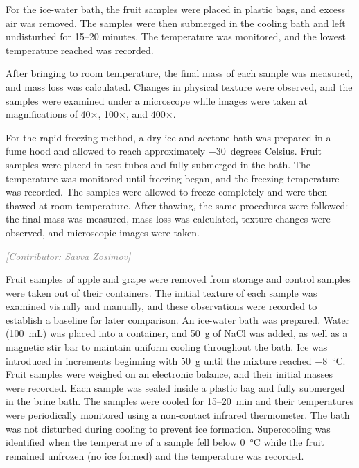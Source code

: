 \documentclass[12pt, a4paper]{article}
\newcommand{\contributor}[1]{\vspace{4pt}\noindent\textcolor{gray}{\small\textit{[Contributor: #1]}}\vspace{2pt}}
\begin{document}
For the ice-water bath, the fruit samples were placed in plastic bags,
and excess air was removed. The samples were then submerged in the
cooling bath and left undisturbed for 15--20 minutes. The temperature
was monitored, and the lowest temperature reached was recorded.


After bringing to room temperature, the final mass of each sample was measured, and mass loss
was calculated. Changes in physical texture were observed, and the
samples were examined under a microscope while images were taken at
magnifications of 40$\times$, 100$\times$, and 400$\times$.

For the rapid freezing method, a dry ice and acetone bath was prepared
in a fume hood and allowed to reach approximately $-$30~degrees Celsius.
Fruit samples were placed in test tubes and fully submerged in the bath.
The temperature was monitored until freezing began, and the freezing
temperature was recorded. The samples were allowed to freeze completely
and were then thawed at room temperature. After thawing, the same
procedures were followed: the final mass was measured, mass loss was
calculated, texture changes were observed, and microscopic images were
taken.

\contributor{Savva Zosimov}

Fruit samples of apple and grape were removed from storage and control
samples were taken out of their containers. The initial texture of each
sample was examined visually and manually, and these observations were
recorded to establish a baseline for later comparison. An ice-water bath
was prepared. Water (100~mL) was placed into a container, and 50~g of
NaCl was added, as well as a magnetic stir bar to maintain uniform
cooling throughout the bath. Ice was introduced in increments beginning
with 50~g until the mixture reached $-$8~°C. Fruit samples were weighed
on an electronic balance, and their initial masses were recorded. Each
sample was sealed inside a plastic bag and fully submerged in the brine
bath. The samples were cooled for 15--20~min and their temperatures were
periodically monitored using a non-contact infrared thermometer. The
bath was not disturbed during cooling to prevent ice formation.
Supercooling was identified when the temperature of a sample fell below
0~°C while the fruit remained unfrozen (no ice formed) and the
temperature was recorded.
\end{document}
